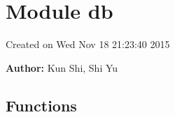 %
%
%


\section{Module db}

    \label{db}
Created on Wed Nov 18 21:23:40 2015

\textbf{Author:} Kun Shi,  Shi Yu





  \subsection{Functions}

    \label{db:ingestDB}

    \vspace{0.5ex}

